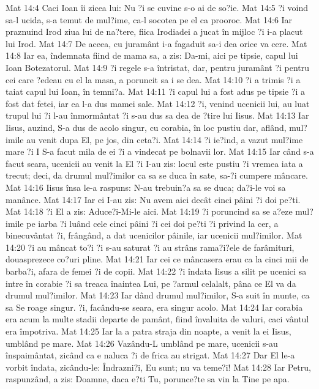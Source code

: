 Mat 14:4  Caci Ioan îi zicea lui: Nu ?i se cuvine s-o ai de so?ie.
Mat 14:5  ?i voind sa-l ucida, s-a temut de mul?ime, ca-l socotea pe el ca prooroc.
Mat 14:6  Iar praznuind Irod ziua lui de na?tere, fiica Irodiadei a jucat în mijloc ?i i-a placut lui Irod.
Mat 14:7  De aceea, cu juramânt i-a fagaduit sa-i dea orice va cere.
Mat 14:8  Iar ea, îndemnata fiind de mama sa, a zis: Da-mi, aici pe tipsie, capul lui Ioan Botezatorul.
Mat 14:9  ?i regele s-a întristat, dar, pentru juramânt ?i pentru cei care ?edeau cu el la masa, a poruncit sa i se dea.
Mat 14:10  ?i a trimis ?i a taiat capul lui Ioan, în temni?a.
Mat 14:11  ?i capul lui a fost adus pe tipsie ?i a fost dat fetei, iar ea l-a dus mamei sale.
Mat 14:12  ?i, venind ucenicii lui, au luat trupul lui ?i l-au înmormântat ?i s-au dus sa dea de ?tire lui Iisus.
Mat 14:13  Iar Iisus, auzind, S-a dus de acolo singur, cu corabia, în loc pustiu dar, aflând, mul?imile au venit dupa El, pe jos, din ceta?i.
Mat 14:14  ?i ie?ind, a vazut mul?ime mare ?i I S-a facut mila de ei ?i a vindecat pe bolnavii lor.
Mat 14:15  Iar când s-a facut seara, ucenicii au venit la El ?i I-au zis: locul este pustiu ?i vremea iata a trecut; deci, da drumul mul?imilor ca sa se duca în sate, sa-?i cumpere mâncare.
Mat 14:16  Iisus însa le-a raspuns: N-au trebuin?a sa se duca; da?i-le voi sa manânce.
Mat 14:17  Iar ei I-au zis: Nu avem aici decât cinci pâini ?i doi pe?ti.
Mat 14:18  ?i El a zis: Aduce?i-Mi-le aici.
Mat 14:19  ?i poruncind sa se a?eze mul?imile pe iarba ?i luând cele cinci pâini ?i cei doi pe?ti ?i privind la cer, a binecuvântat ?i, frângând, a dat ucenicilor pâinile, iar ucenicii mul?imilor.
Mat 14:20  ?i au mâncat to?i ?i s-au saturat ?i au strâns rama?i?ele de farâmituri, douasprezece co?uri pline.
Mat 14:21  Iar cei ce mâncasera erau ca la cinci mii de barba?i, afara de femei ?i de copii.
Mat 14:22  ?i îndata Iisus a silit pe ucenici sa intre în corabie ?i sa treaca înaintea Lui, pe ?armul celalalt, pâna ce El va da drumul mul?imilor.
Mat 14:23  Iar dând drumul mul?imilor, S-a suit în munte, ca sa Se roage singur. ?i, facându-se seara, era singur acolo.
Mat 14:24  Iar corabia era acum la multe stadii departe de pamânt, fiind învaluita de valuri, caci vântul era împotriva.
Mat 14:25  Iar la a patra straja din noapte, a venit la ei Iisus, umblând pe mare.
Mat 14:26  Vazându-L umblând pe mare, ucenicii s-au înspaimântat, zicând ca e naluca ?i de frica au strigat.
Mat 14:27  Dar El le-a vorbit îndata, zicându-le: Îndrazni?i, Eu sunt; nu va teme?i!
Mat 14:28  Iar Petru, raspunzând, a zis: Doamne, daca e?ti Tu, porunce?te sa vin la Tine pe apa.
